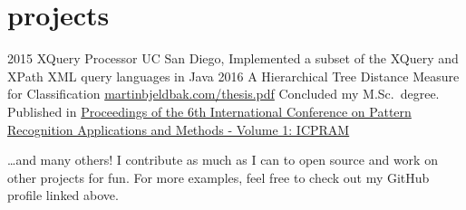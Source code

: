 \documentclass{afriggeri-cv/friggeri-cv}
\begin{document}
\section{projects}
\begin{entrylist}
  \entry
    {2015}
    {XQuery Processor}
    {UC San Diego, }
    {Implemented a subset of the XQuery and XPath XML query languages in Java}
  \entry
    {2016}
    {A Hierarchical Tree Distance Measure for Classification}
    {\href{http://martinbjeldbak.com/thesis.pdf}{martinbjeldbak.com/thesis.pdf}}
    {Concluded my M.Sc.\ degree. Published in \href{http://www.scitepress.org/DigitalLibrary/PublicationsDetail.aspx?ID=xSe8tY7QfHE=&t=1}{Proceedings of the 6th International Conference on Pattern Recognition Applications and Methods - Volume 1: ICPRAM}}
\end{entrylist}

\dots and many others! I contribute as much as I can to open source and work on other projects for fun. For more examples, feel free to check out my GitHub profile linked above.
\end{document}
